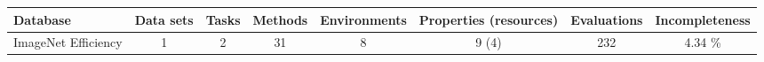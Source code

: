 
    \begin{tabular}{lccccccc}
        \toprule 
        Database & Data sets & Tasks & Methods & Environments & Properties (resources) & Evaluations & Incompleteness \\
        \midrule
        ImageNet Efficiency & 1 & 2 & 31 & 8 & 9 (4) & 232 &  4.34 \% \\
        \bottomrule
    \end{tabular}